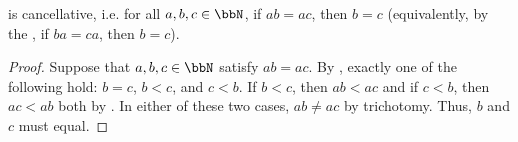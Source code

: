 \begin{proposition} \label{proposition:cancellativity_of_multiplication_in_the_natural_numbers}
     is cancellative, i.e. for all $a,b,c \in \bbN$, if $ab = ac$, then $b = c$ (equivalently, by the , if $ba = ca$, then $b = c$).
\end{proposition}
\begin{proof}
    Suppose that $a,b,c \in \bbN$ satisfy $ab = ac$. By , exactly one of the following hold: $b = c$, $b < c$, and $c < b$. If $b < c$, then $ab < ac$ and if $c < b$, then $ac < ab$ both by . In either of these two cases, $ab \neq ac$ by trichotomy. Thus, $b$ and $c$ must equal. 
\end{proof}